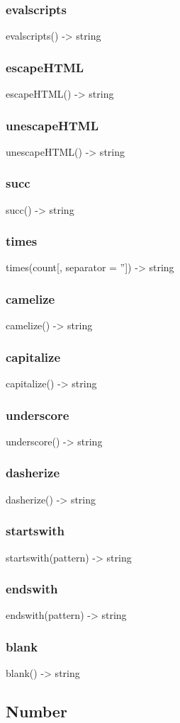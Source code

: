 {{{{{{{{\subsubsection*{evalscripts}
evalscripts() -> string
\subsubsection*{escapeHTML}
escapeHTML() -> string
\subsubsection*{unescapeHTML}
unescapeHTML() -> string
\subsubsection*{succ}
succ() -> string
\subsubsection*{times}
times(count[, separator = '']) -> string
\subsubsection*{camelize}
camelize() -> string
\subsubsection*{capitalize}
capitalize() -> string
\subsubsection*{underscore}
underscore() -> string
\subsubsection*{dasherize}
dasherize() -> string
\subsubsection*{startswith}
startswith(pattern) -> string
\subsubsection*{endswith}
endswith(pattern) -> string
\subsubsection*{blank}
blank() -> string

\subsection{Number}
}}}}}}}}
